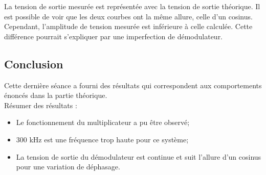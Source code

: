 La tension de sortie mesurée est représentée avec la tension de sortie théorique. Il est possible
de voir que les deux courbes ont la même allure, celle d'un cosinus. Cependant, l'amplitude de 
tension mesurée est inférieure à celle calculée. Cette différence pourrait s'expliquer par une 
imperfection de démodulateur.

\subsection{Conclusion}

Cette dernière séance a fourni des résultats qui correspondent aux comportements énoncés dans la 
partie théorique.\\

Résumer des résultats :

\begin{itemize}
    \item Le fonctionnement du multiplicateur a pu être observé;
    \item 300 kHz est une fréquence trop haute pour ce système;
    \item La tension de sortie du démodulateur est continue et suit l'allure d'un cosinus pour une 
    variation de déphasage.
\end{itemize}
